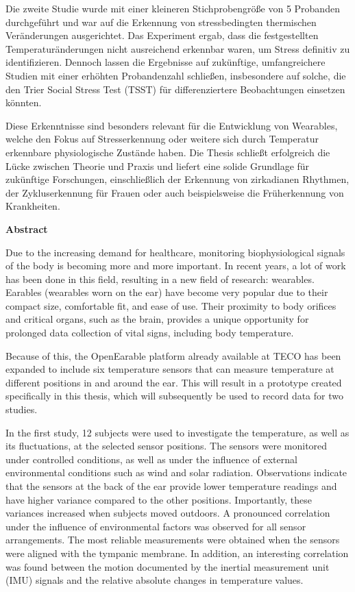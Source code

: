 Die zweite Studie wurde mit einer kleineren Stichprobengröße von 5 Probanden durchgeführt und war auf die Erkennung von stressbedingten thermischen Veränderungen ausgerichtet. 
Das Experiment ergab, dass die festgestellten Temperaturänderungen nicht ausreichend erkennbar waren, um Stress definitiv zu identifizieren.
Dennoch lassen die Ergebnisse auf zukünftige, umfangreichere Studien mit einer erhöhten Probandenzahl schließen, insbesondere auf solche, die den Trier Social Stress Test (TSST) für differenziertere Beobachtungen einsetzen könnten.

Diese Erkenntnisse sind besonders relevant für die Entwicklung von Wearables, welche den Fokus auf Stresserkennung oder weitere sich durch Temperatur erkennbare physiologische Zustände haben. 
Die Thesis schließt erfolgreich die Lücke zwischen Theorie und Praxis und liefert eine solide Grundlage für zukünftige Forschungen, einschließlich der Erkennung von zirkadianen Rhythmen, der Zykluserkennung für Frauen oder auch beispielsweise die Früherkennung von Krankheiten.

\cleardoublepage
\vspace*{1em}
\begin{center}
	\textbf{Abstract}
\end{center}
\par

Due to the increasing demand for healthcare, monitoring biophysiological signals of the body is becoming more and more important.
In recent years, a lot of work has been done in this field, resulting in a new field of research: wearables.
Earables (wearables worn on the ear) have become very popular due to their compact size, comfortable fit, and ease of use. Their proximity to body orifices and critical organs, such as the brain, provides a unique opportunity for prolonged data collection of vital signs, including body temperature.

Because of this, the OpenEarable platform already available at TECO has been expanded to include six temperature sensors that can measure temperature at different positions in and around the ear. 
This will result in a prototype created specifically in this thesis, which will subsequently be used to record data for two studies.

In the first study, 12 subjects were used to investigate the temperature, as well as its fluctuations, at the selected sensor positions. 
The sensors were monitored under controlled conditions, as well as under the influence of external environmental conditions such as wind and solar radiation. 
Observations indicate that the sensors at the back of the ear provide lower temperature readings and have higher variance compared to the other positions. 
Importantly, these variances increased when subjects moved outdoors. 
A pronounced correlation under the influence of environmental factors was observed for all sensor arrangements. 
The most reliable measurements were obtained when the sensors were aligned with the tympanic membrane. 
In addition, an interesting correlation was found between the motion documented by the inertial measurement unit (IMU) signals and the relative absolute changes in temperature values.

